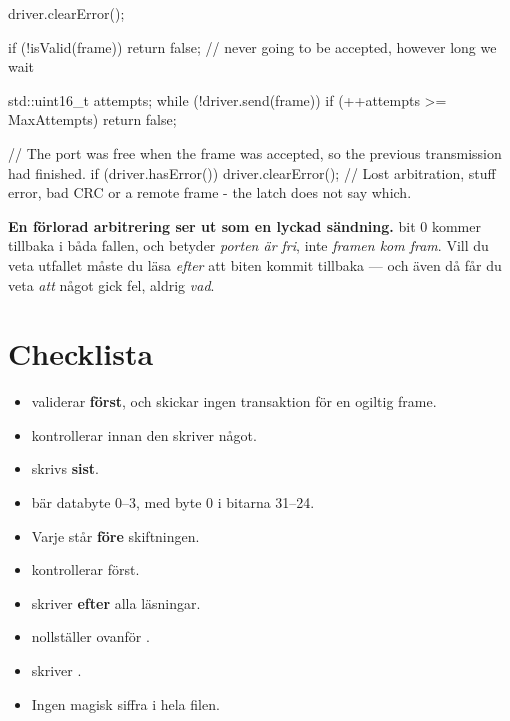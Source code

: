 \begin{cppcode}
driver.clearError();

if (!isValid(frame)) { return false; }   // never going to be accepted, however long we wait

std::uint16_t attempts{};
while (!driver.send(frame))
{
    if (++attempts >= MaxAttempts) { return false; }
}

// The port was free when the frame was accepted, so the previous transmission had finished.
if (driver.hasError())
{
    driver.clearError();
    // Lost arbitration, stuff error, bad CRC or a remote frame - the latch does not say which.
}
\end{cppcode}

\begin{limitation}
\textbf{En förlorad arbitrering ser ut som en lyckad sändning.}  bit 0 kommer tillbaka
i båda fallen, och betyder \emph{porten är fri}, inte \emph{framen kom fram}. Vill du veta
utfallet måste du läsa  \emph{efter} att biten kommit tillbaka --- och även då
får du veta \emph{att} något gick fel, aldrig \emph{vad}.
\end{limitation}

\section{Checklista}
\label{sec:checklist}

\begin{itemize}
  \item[\checkbox]  validerar \textbf{först}, och skickar ingen transaktion för en
    ogiltig frame.
  \item[\checkbox]  kontrollerar  innan den skriver något.
  \item[\checkbox]  skrivs \textbf{sist}.
  \item[\checkbox]  bär databyte 0--3, med byte 0 i bitarna 31--24.
  \item[\checkbox] Varje  står \textbf{före} skiftningen.
  \item[\checkbox]  kontrollerar  först.
  \item[\checkbox]  skriver  \textbf{efter} alla läsningar.
  \item[\checkbox]  nollställer  ovanför .
  \item[\checkbox]  skriver .
  \item[\checkbox] Ingen magisk siffra i hela filen.
\end{itemize}
